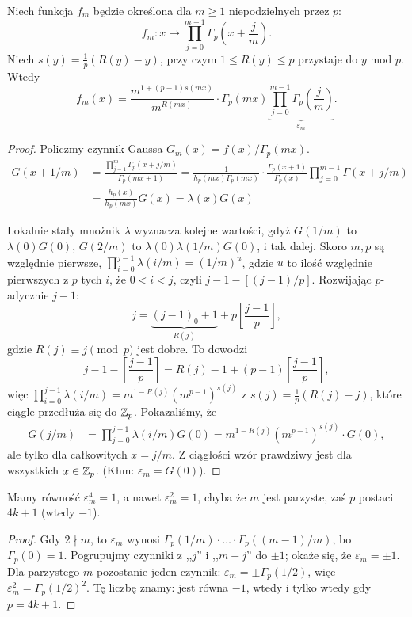 \begin{fakt}
	Niech funkcja $f_m$ będzie określona dla  $m \ge 1$ niepodzielnych przez $p$:
	\[
		f_m \colon x \mapsto \prod_{j = 0}^{m - 1} \Gamma_p \left(x + \frac j m \right).
	\]
	Niech $s(y) = \frac 1 p (R(y) -y)$, przy czym $1 \le R(y) \le p$ przystaje do $y$ mod $p$.
	Wtedy
	\[
		f_m(x) = \frac{m^{1 + (p-1)s(mx)}}{m^{R(mx)}} \cdot \Gamma_p(mx) \underbrace{\prod_{j=0}^{m-1} \Gamma_p\left(\frac jm\right)}_{\varepsilon_m}.
	\]
\end{fakt}

\begin{proof}
	Policzmy czynnik Gaussa $G_m(x) = f(x)/\Gamma_p(mx)$.
	\begin{align*}
	G(x+1/m) & = \frac{\prod_{j=1}^m \Gamma_p(x+j/m)}{\Gamma_p(mx+1)}  = \frac{1}{h_p(mx)\Gamma_p(mx)} \cdot \frac{\Gamma_p(x+1)}{\Gamma_p(x)} \prod_{j=0}^{m-1} \Gamma(x+j/m)  \\
	& = \frac{h_p(x)}{h_p(mx)}G(x) = \lambda(x) G(x)
	\end{align*}

	Lokalnie stały mnożnik $\lambda$ wyznacza kolejne wartości, gdyż $G(1/m)$ to $\lambda(0) G(0)$, $G(2/m)$ to $\lambda(0)\lambda(1/m) G(0)$, i tak dalej.
	Skoro $m,p$ są względnie pierwsze, $\prod_{i=0}^{j-1} \lambda(i/m) = (1/m)^u$, gdzie $u$ to ilość względnie pierwszych z $p$ tych $i$, że $0 < i < j$, czyli $j-1 - [(j-1)/p]$.
	Rozwijając $p$-adycznie $j-1$:
	\[
		j = \underbrace{(j-1)_0 + 1}_{R(j)}+ p \left[ \frac{j-1}p\right],
	\]
	gdzie $R(j) \equiv j \pmod p$ jest dobre.
	To dowodzi
	\[
		j-1 - \left[\frac{j-1}p \right] = R(j) -1 + (p-1) \left[\frac{j-1}p\right],
	\]
	więc $\prod_{i=0}^{j-1} \lambda(i/m) = m^{1-R(j)}(m^{p-1})^{s(j)}$ z $s(j) = \frac 1p (R(j)-j)$, które ciągle przedłuża się do $\mathbb Z_p$.
	Pokazaliśmy, że
	\begin{align*}
		G(j/m) & = \prod_{j=0}^{j-1} \lambda(i/m) G(0)  = m^{1-R(j)} (m^{p-1})^{s(j)} \cdot G(0),
	\end{align*}
	ale tylko dla całkowitych $x = j/m$.
	Z ciągłości wzór prawdziwy jest dla wszystkich $x \in \mathbb Z_p$.
	(Khm: $\varepsilon_m = G(0)$).
\end{proof}

\begin{lemat}
	Mamy równość $\varepsilon_m^4 = 1$, a nawet $\varepsilon_m^2= 1$, chyba że $m$ jest parzyste, zaś $p$ postaci $4k+1$ (wtedy $-1$).
\end{lemat}

\begin{proof}
	Gdy $2 \nmid m$, to $\varepsilon_m$ wynosi $\Gamma_p(1/m)\cdot \ldots \cdot \Gamma_p((m-1)/m)$, bo $\Gamma_p(0)= 1$.
	Pogrupujmy czynniki z ,,$j$'' i ,,$m-j$'' do $\pm 1$; okaże się, że $\varepsilon_m = \pm 1$.
	Dla parzystego $m$ pozostanie jeden czynnik: $\varepsilon_m = \pm \Gamma_p(1/2)$, więc $\varepsilon_m^2 = \Gamma_p(1/2)^2$.
	Tę liczbę znamy: jest równa $-1$, wtedy i tylko wtedy gdy $p = 4k+1$.
\end{proof}

